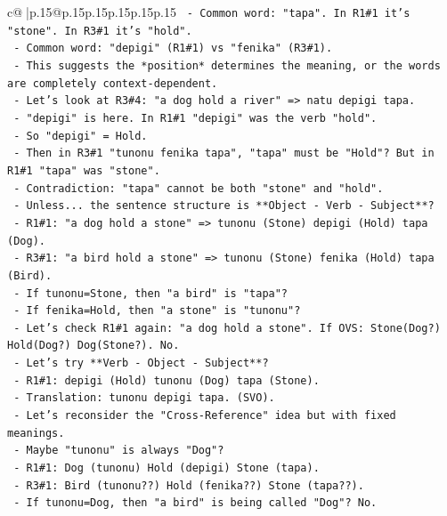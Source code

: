 \documentclass{article}
\begin{document}
{\begin{supertabular}{c@{$\;$}|p{.15\linewidth}@{}p{.15\linewidth}p{.15\linewidth}p{.15\linewidth}p{.15\linewidth}p{.15\linewidth}}
{{{\texttt{      {-} Common word: "tapa". In R1\#1 it's "stone". In R3\#1 it's "hold".} \\
\texttt{      {-} Common word: "depigi" (R1\#1) vs "fenika" (R3\#1).} \\
\texttt{      {-} This suggests the *position* determines the meaning, or the words are completely context{-}dependent.} \\
\texttt{      {-} Let's look at R3\#4: "a dog hold a river" => natu depigi tapa.} \\
\texttt{        {-} "depigi" is here. In R1\#1 "depigi" was the verb "hold".} \\
\texttt{        {-} So "depigi" = Hold.} \\
\texttt{        {-} Then in R3\#1 "tunonu fenika tapa", "tapa" must be "Hold"? But in R1\#1 "tapa" was "stone".} \\
\texttt{        {-} Contradiction: "tapa" cannot be both "stone" and "hold".} \\
\texttt{        {-} Unless... the sentence structure is **Object {-} Verb {-} Subject**?} \\
\texttt{          {-} R1\#1: "a dog hold a stone" => tunonu (Stone) depigi (Hold) tapa (Dog).} \\
\texttt{          {-} R3\#1: "a bird hold a stone" => tunonu (Stone) fenika (Hold) tapa (Bird).} \\
\texttt{            {-} If tunonu=Stone, then "a bird" is "tapa"?} \\
\texttt{            {-} If fenika=Hold, then "a stone" is "tunonu"?} \\
\texttt{            {-} Let's check R1\#1 again: "a dog hold a stone". If OVS: Stone(Dog?) Hold(Dog?) Dog(Stone?). No.} \\
\texttt{      {-} Let's try **Verb {-} Object {-} Subject**?} \\
\texttt{        {-} R1\#1: depigi (Hold) tunonu (Dog) tapa (Stone).} \\
\texttt{          {-} Translation: tunonu depigi tapa. (SVO).} \\
\texttt{      {-} Let's reconsider the "Cross{-}Reference" idea but with fixed meanings.} \\
\texttt{        {-} Maybe "tunonu" is always "Dog"?} \\
\texttt{          {-} R1\#1: Dog (tunonu) Hold (depigi) Stone (tapa).} \\
\texttt{          {-} R3\#1: Bird (tunonu??) Hold (fenika??) Stone (tapa??).} \\
\texttt{          {-} If tunonu=Dog, then "a bird" is being called "Dog"? No.} \\
}}}
\end{supertabular}}
\end{document}
